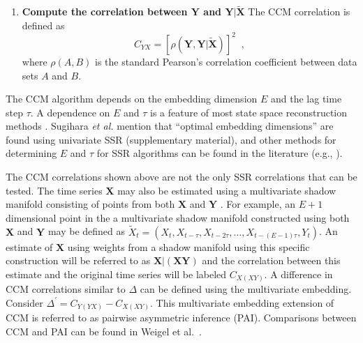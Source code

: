 \documentclass{article}[10pt]
\begin{document}
\begin{enumerate}
\item {\bf Compute the correlation between $\mathbf{Y}$ and $\mathbf{Y}|\tilde{\mathbf{X}}$}
The CCM correlation is defined as 
\begin{equation}
C_{YX} = \left[\rho\left(\mathbf{Y},\mathbf{Y}|\tilde{\mathbf{X}}\right)\right]^2\;\;,
\end{equation}
where $\rho\left(A,B\right)$ is the standard Pearson's correlation coefficient between data sets $A$ and $B$.  
\end{enumerate}

The CCM algorithm depends on the embedding dimension $E$ and the lag time step $\tau$.  A dependence on $E$ and $\tau$ is a feature of most state space reconstruction methods \cite{Hong2006,vlachos2009,Small2004}.  Sugihara {\em et al.} mention that ``optimal embedding dimensions'' are found using univariate SSR \cite{Sugihara2012} (supplementary material), and other methods for determining $E$ and $\tau$ for SSR algorithms can be found in the literature (e.g., \cite{Hong2006,Small2004,Kennel1992}).

The CCM correlations shown above are not the only SSR correlations that can be tested.  The time series $\mathbf{X}$ may also be estimated using a multivariate shadow manifold consisting of points from both $\mathbf{X}$ and $\mathbf{Y}$ \cite{Deyle2013}.  For example, an $E+1$ dimensional point in the a multivariate shadow manifold constructed using both $\mathbf{X}$ and $\mathbf{Y}$ may be defined as $\tilde{X}_t=(X_t,X_{t-\tau},X_{t-2\tau},\ldots,X_{t-(E-1)\tau},Y_t)$.  An estimate of $\mathbf{X}$ using weights from a shadow manifold using this specific construction will be referred to as $\mathbf{X}|(\mathbf{XY})$ and the correlation between this estimate and the original time series will be labeled $C_{X(XY)}$.  A difference in CCM correlations similar to $\Delta$ can be defined using the multivariate embedding.  Consider $\Delta^\prime = C_{Y(YX)} - C_{X(XY)}$.  This multivariate embedding extension of CCM is referred to as pairwise asymmetric inference (PAI).  Comparisons between CCM and PAI can be found in Weigel et al.\ \cite{Weigel2014}.  
\end{document}
